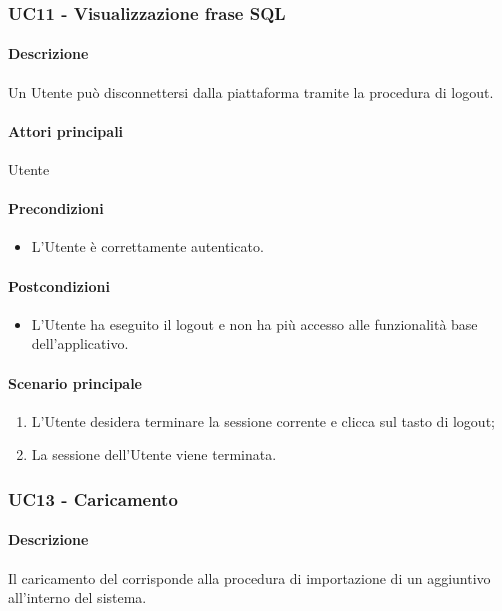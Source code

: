 \subsubsection{UC11 - Visualizzazione frase SQL}\label{UC11}
\paragraph*{Descrizione} Un Utente può disconnettersi dalla piattaforma tramite la procedura di logout.

\paragraph*{Attori principali} Utente

\paragraph*{Precondizioni}
\begin{itemize}
  \item L’Utente è correttamente autenticato.
\end{itemize}

\paragraph*{Postcondizioni}
\begin{itemize}
  \item L’Utente ha eseguito il logout e non ha più accesso alle funzionalità base dell’applicativo.
\end{itemize}

\paragraph*{Scenario principale}
\begin{enumerate}
  \item L’Utente desidera terminare la sessione corrente e clicca sul tasto di logout;
  \item La sessione dell’Utente viene terminata.  
\end{enumerate}


\subsubsection{UC13 - Caricamento }\label{UC13}
\paragraph*{Descrizione} Il caricamento del  corrisponde alla procedura di importazione di un  aggiuntivo all’interno del sistema.

